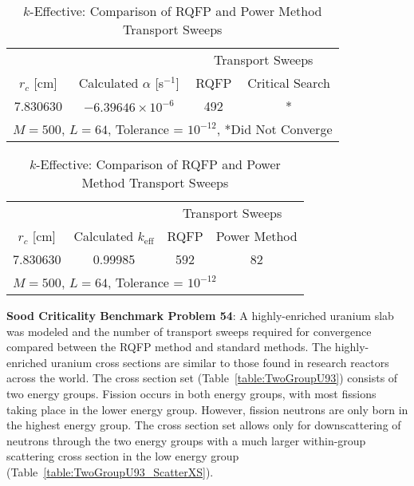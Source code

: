 \begin{table}[!htbp]
	\caption{Calculated Eigenvalues and Transport Sweep Comparisons for Sood Criticality Benchmark Problem 51 in \cite{sood2003analytical}}
	\label{table:SlabMG-U-Al}
	\begin{subtable}[!htbp]{1.0\textwidth}
	\centering{}
	\begin{tabular}{@{}cccc@{}}\toprule
	& & \multicolumn{2}{c}{Transport Sweeps} \\
	\cmidrule{3-4} $r_{c}$ [cm] & Calculated $\alpha$ [s$^{-1}$] & RQFP & Critical Search\\
	\midrule
	7.830630 & $-6.39646 \times 10^{-6}$ & 492 & * \\
	\bottomrule
	\multicolumn{4}{l}{$M = 500$, $L = 64$, Tolerance = $10^{-12}$, *Did Not Converge} \\
	\end{tabular}
	\caption{Alpha-Eigenvalue: Comparison of RQFP and Critical Search Transport Sweeps}
	\label{table:MG-U-Al-alpha}
	\end{subtable}%
	\vspace{0.25cm}
	\begin{subtable}[!htbp]{1.0\textwidth}
	\centering{}
	\begin{tabular}{@{}cccc@{}}\toprule
	& & \multicolumn{2}{c}{Transport Sweeps} \\
	\cmidrule{3-4} $r_{c}$ [cm] & Calculated $k_{\text{eff}}$ & RQFP & Power Method \\
	\midrule
	7.830630 & 0.99985 & 592 & 82 \\
	\bottomrule%
	\multicolumn{4}{l}{$M = 500$, $L = 64$, Tolerance = $10^{-12}$} \\
	\end{tabular}
	\caption{$k$-Effective: Comparison of RQFP and Power Method Transport Sweeps}
	\label{table:MG-U-Al-k}
	\end{subtable}
\end{table}

\clearpage

\textbf{Sood Criticality Benchmark Problem 54}: A highly-enriched uranium slab was modeled and the number of transport sweeps required for convergence compared between the RQFP method and standard methods. The highly-enriched uranium cross sections are similar to those found in research reactors across the world. The cross section set (Table~\ref{table:TwoGroupU93}) consists of two energy groups. Fission occurs in both energy groups, with most fissions taking place in the lower energy group. However, fission neutrons are only born in the highest energy group. The cross section set allows only for downscattering of neutrons through the two energy groups with a much larger within-group scattering cross section in the low energy group (Table~\ref{table:TwoGroupU93_ScatterXS}).

